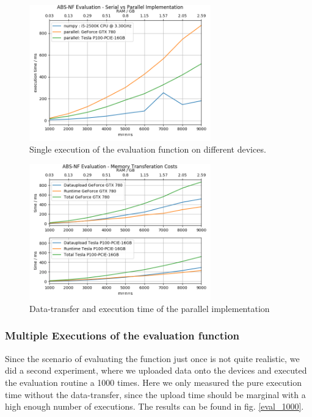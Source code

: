 \begin{figure}[ht]
	\centering
	\includegraphics[width=0.7\textwidth]{img/eval_single_repetition.png}
	\caption{Single execution of the evaluation function on different devices.}
	\label{eval_single_repetition}
\end{figure}

\begin{figure}[ht]
	\centering
	\includegraphics[width=0.7\textwidth]{img/eval_memory.png}
	\caption{Data-transfer and execution time of the parallel implementation}
	\label{eval_memory}
\end{figure}

\subsubsection{Multiple Executions of the evaluation function}

Since the scenario of evaluating the function just once is not quite realistic, we did a second experiment, where we uploaded data onto the devices and executed the evaluation routine a 1000 times. Here we only measured the pure execution time without the data-transfer, since the upload time should be marginal with a high enough number of executions. The results can be found in fig. \ref{eval_1000}.

